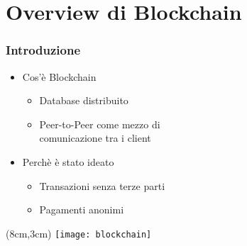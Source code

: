 \section{Overview di Blockchain}
\begin{frame}
  \frametitle{Introduzione}

  \begin{itemize}
   \item<1-> Cos'è Blockchain
   \begin{itemize}
    \item Database distribuito
    \item Peer-to-Peer come mezzo di \\
    comunicazione tra i client
   \end{itemize}

   \item<2-> Perchè è stato ideato
   \begin{itemize}
    \item Transazioni senza terze parti
    \item Pagamenti anonimi
   \end{itemize}

  \end{itemize}

 \begin{textblock*}{5cm}(8cm,3cm)
  \texttt{[image: blockchain]}
 \end{textblock*}

\end{frame}
